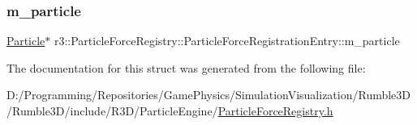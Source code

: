 \subsubsection{\texorpdfstring{m\+\_\+particle}{m\_particle}}
{\footnotesize\ttfamily \mbox{\hyperlink{classr3_1_1_particle}{Particle}}$\ast$ r3\+::\+Particle\+Force\+Registry\+::\+Particle\+Force\+Registration\+Entry\+::m\+\_\+particle}



The documentation for this struct was generated from the following file\+:\begin{DoxyCompactItemize}
\item 
D\+:/\+Programming/\+Repositories/\+Game\+Physics/\+Simulation\+Visualization/\+Rumble3\+D/\+Rumble3\+D/include/\+R3\+D/\+Particle\+Engine/\mbox{\hyperlink{_particle_force_registry_8h}{Particle\+Force\+Registry.\+h}}\end{DoxyCompactItemize}

